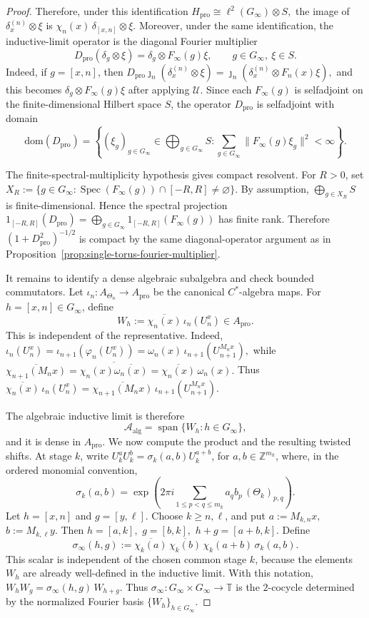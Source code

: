 \documentclass[11pt]{amsart}
\theoremstyle{definition}
\theoremstyle{remark}
\newcommand{\T}{\mathbb{T}}
\newcommand{\Z}{\mathbb{Z}}
\newcommand{\ex}{\mathrm{pro}}
\newcommand{\dom}{\mathrm{dom}}
\begin{document}
\begin{proof}
Therefore, under this identification $H_\ex\cong \ell^2(G_\infty)\otimes S,$
the image of $\delta_x^{(n)}\otimes\xi$ is $\chi_n(x)\,\delta_{[x,n]}\otimes\xi.$ Moreover, under the same identification, the inductive-limit operator is the diagonal Fourier multiplier
\[
D_\ex(\delta_g\otimes\xi)
=
\delta_g\otimes F_\infty(g)\xi,
\qquad
g\in G_\infty,\ \xi\in S.
\]
Indeed, if $g=[x,n]$, then $D_\ex\jmath_n(\delta_x^{(n)}\otimes\xi)
=\jmath_n(\delta_x^{(n)}\otimes F_n(x)\xi),$
and this becomes $\delta_g\otimes F_\infty(g)\xi$
after applying $\mathcal U$. Since each $F_\infty(g)$ is selfadjoint on the
finite-dimensional Hilbert space $S$, the operator $D_\ex$ is selfadjoint
with domain
\[
\dom(D_\ex)
=
\left\{
(\xi_g)_{g\in G_\infty}\in\bigoplus_{g\in G_\infty}S:
\sum_{g\in G_\infty}\|F_\infty(g)\xi_g\|^2<\infty
\right\}.
\]

The finite-spectral-multiplicity hypothesis gives compact resolvent. For
$R>0$, set $X_R:=
\{g\in G_\infty:
\operatorname{Spec}(F_\infty(g))\cap[-R,R]\neq\varnothing\}.$
By assumption, $\bigoplus_{g\in X_R}S$
is finite-dimensional. Hence the spectral projection $1_{[-R,R]}(D_\ex)=\bigoplus_{g\in G_\infty}1_{[-R,R]}(F_\infty(g))$
has finite rank. Therefore $(1+D_\ex^2)^{-1/2}$ is compact by the same
diagonal-operator argument as in
Proposition~\ref{prop:single-torus-fourier-multiplier}.

It remains to identify a dense algebraic subalgebra and check bounded
commutators. Let $\iota_n\colon A_{\Theta_n}\to A_\ex$
be the canonical $C^*$-algebra maps. For $h=[x,n]\in G_\infty$, define
\[
W_h
:=
\overline{\chi_n(x)}\,\iota_n(U_n^x)
\in A_\ex.
\]
This is independent of the representative. Indeed, $\iota_n(U_n^x)
=\iota_{n+1}(\varphi_n(U_n^x))=\omega_n(x)\,\iota_{n+1}(U_{n+1}^{M_nx}),$
while $\overline{\chi_{n+1}(M_nx)}=
\overline{\chi_n(x)\overline{\omega_n(x)}}=
\overline{\chi_n(x)}\,\omega_n(x).$
Thus $\overline{\chi_n(x)}\,\iota_n(U_n^x)=\overline{\chi_{n+1}(M_nx)}\,\iota_{n+1}(U_{n+1}^{M_nx}).$

The algebraic inductive limit is therefore
\[
\mathcal A_{\mathrm{alg}}
=
\operatorname{span}\{W_h:h\in G_\infty\},
\]
and it is dense in $A_\ex$. We now compute the product and the resulting twisted shifts. At stage $k$,
write $U_k^aU_k^b=\sigma_k(a,b)U_k^{a+b}$, for $a,b\in\Z^{m_k}$,
where, in the ordered monomial convention,
\[
\sigma_k(a,b)
=
\exp\!\left(
2\pi i
\sum_{1\leq p<q\leq m_k}
a_qb_p\,(\Theta_k)_{p,q}
\right).
\]
Let $h=[x,n]$ and $g=[y,\ell]$. Choose $k\geq n,\ell$, and put $a:=M_{k,n}x,$
$b:=M_{k,\ell}y.$
Then $h=[a,k],$ $g=[b,k],$ $h+g=[a+b,k].$
Define
\[
\sigma_\infty(h,g)
:=
\overline{\chi_k(a)}\,
\overline{\chi_k(b)}\,
\chi_k(a+b)\,
\sigma_k(a,b).
\]
This scalar is independent of the chosen common stage $k$, because the
elements $W_h$ are already well-defined in the inductive limit. With this
notation, $W_hW_g=\sigma_\infty(h,g)\,W_{h+g}.$
Thus $\sigma_\infty\colon G_\infty\times G_\infty\to\T$ is the $2$-cocycle
determined by the normalized Fourier basis $\{W_h\}_{h\in G_\infty}$.


\end{proof}
\end{document}
